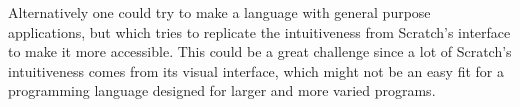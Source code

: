 Alternatively one could try to make a language with general purpose applications, but which tries to replicate the intuitiveness from Scratch's interface to make it more accessible.
This could be a great challenge since a lot of Scratch's intuitiveness comes from its visual interface, which might not be an easy fit for a programming language designed for larger and more varied programs.

